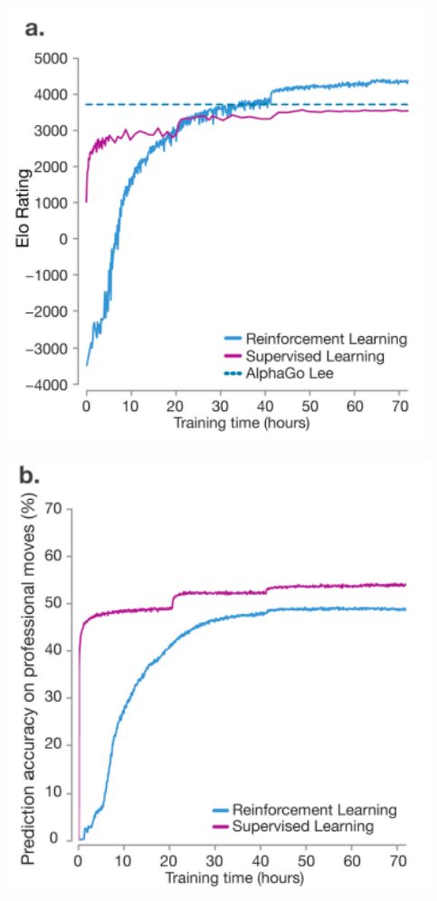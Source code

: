 {

\centerline{\includegraphics[height = 5in]{../images/alphalearning1}}


\centerline{\includegraphics[height = 5in]{../images/alphalearning2}}

}

